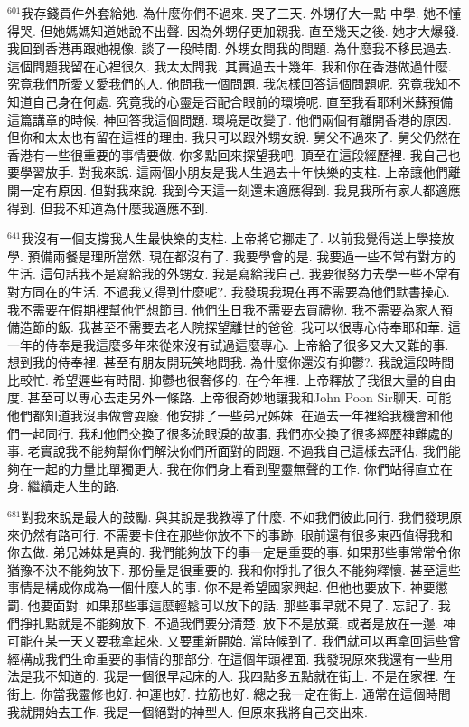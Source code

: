 \documentclass{book}
\begin{document}
$^{601}$我存錢買件外套給她.
為什麼你們不過來.
哭了三天.
外甥仔大一點 中學.
她不懂得哭.
但她媽媽知道她說不出聲.
因為外甥仔更加親我.
直至幾天之後.
她才大爆發.
我回到香港再跟她視像.
談了一段時間.
外甥女問我的問題.
為什麼我不移民過去.
這個問題我留在心裡很久.
我太太問我.
其實過去十幾年.
我和你在香港做過什麼.
究竟我們所愛又愛我們的人.
他問我一個問題.
我怎樣回答這個問題呢.
究竟我知不知道自己身在何處.
究竟我的心靈是否配合眼前的環境呢.
直至我看耶利米蘇預備這篇講章的時候.
神回答我這個問題.
環境是改變了.
他們兩個有離開香港的原因.
但你和太太也有留在這裡的理由.
我只可以跟外甥女說.
舅父不過來了.
舅父仍然在香港有一些很重要的事情要做.
你多點回來探望我吧.
頂至在這段經歷裡.
我自己也要學習放手.
對我來說.
這兩個小朋友是我人生過去十年快樂的支柱.
上帝讓他們離開一定有原因.
但對我來說.
我到今天這一刻還未適應得到.
我見我所有家人都適應得到.
但我不知道為什麼我適應不到.

$^{641}$我沒有一個支撐我人生最快樂的支柱.
上帝將它挪走了.
以前我覺得送上學接放學.
預備兩餐是理所當然.
現在都沒有了.
我要學會的是.
我要過一些不常有對方的生活.
這句話我不是寫給我的外甥女.
我是寫給我自己.
我要很努力去學一些不常有對方同在的生活.
不過我又得到什麼呢?.
我發現我現在再不需要為他們默書操心.
我不需要在假期裡幫他們想節目.
他們生日我不需要去買禮物.
我不需要為家人預備造節的飯.
我甚至不需要去老人院探望離世的爸爸.
我可以很專心侍奉耶和華.
這一年的侍奉是我這麼多年來從來沒有試過這麼專心.
上帝給了很多又大又難的事.
想到我的侍奉裡.
甚至有朋友開玩笑地問我.
為什麼你還沒有抑鬱?.
我說這段時間比較忙.
希望遲些有時間.
抑鬱也很奢侈的.
在今年裡.
上帝釋放了我很大量的自由度.
甚至可以專心去走另外一條路.
上帝很奇妙地讓我和John Poon Sir聊天.
可能他們都知道我沒事做會耍廢.
他安排了一些弟兄姊妹.
在過去一年裡給我機會和他們一起同行.
我和他們交換了很多流眼淚的故事.
我們亦交換了很多經歷神難處的事.
老實說我不能夠幫你們解決你們所面對的問題.
不過我自己這樣去評估.
我們能夠在一起的力量比單獨更大.
我在你們身上看到聖靈無聲的工作.
你們站得直立在身.
繼續走人生的路.

$^{681}$對我來說是最大的鼓勵.
與其說是我教導了什麼.
不如我們彼此同行.
我們發現原來仍然有路可行.
不需要卡住在那些你放不下的事跡.
眼前還有很多東西值得我和你去做.
弟兄姊妹是真的.
我們能夠放下的事一定是重要的事.
如果那些事常常令你猶豫不決不能夠放下.
那份量是很重要的.
我和你掙扎了很久不能夠釋懷.
甚至這些事情是構成你成為一個什麼人的事.
你不是希望國家興起.
但他也要放下.
神要懲罰.
他要面對.
如果那些事這麼輕鬆可以放下的話.
那些事早就不見了.
忘記了.
我們掙扎點就是不能夠放下.
不過我們要分清楚.
放下不是放棄.
或者是放在一邊.
神可能在某一天又要我拿起來.
又要重新開始.
當時候到了.
我們就可以再拿回這些曾經構成我們生命重要的事情的那部分.
在這個年頭裡面.
我發現原來我還有一些用法是我不知道的.
我是一個很早起床的人.
我四點多五點就在街上.
不是在家裡.
在街上.
你當我靈修也好.
神運也好.
拉筋也好.
總之我一定在街上.
通常在這個時間我就開始去工作.
我是一個絕對的神型人.
但原來我將自己交出來.
\end{document}
